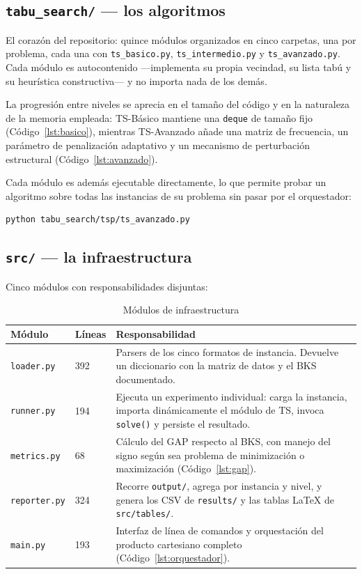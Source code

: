 \subsection{\texttt{tabu\_search/} --- los algoritmos}

El corazón del repositorio: quince módulos organizados en cinco carpetas, una
por problema, cada una con \texttt{ts\_basico.py}, \texttt{ts\_intermedio.py}
y \texttt{ts\_avanzado.py}. Cada módulo es autocontenido —implementa su propia
vecindad, su lista tabú y su heurística constructiva— y no importa nada de los
demás.

La progresión entre niveles se aprecia en el tamaño del código y en la
naturaleza de la memoria empleada: TS-Básico mantiene una \texttt{deque} de
tamaño fijo (Código~\ref{lst:basico}), mientras TS-Avanzado añade una matriz
de frecuencia, un parámetro de penalización adaptativo y un mecanismo de
perturbación estructural (Código~\ref{lst:avanzado}).

Cada módulo es además ejecutable directamente, lo que permite probar un
algoritmo sobre todas las instancias de su problema sin pasar por el
orquestador:

\begin{verbatim}
python tabu_search/tsp/ts_avanzado.py
\end{verbatim}

\subsection{\texttt{src/} --- la infraestructura}

Cinco módulos con responsabilidades disjuntas:

\begin{table}[H]
\centering
\caption{Módulos de infraestructura}
\label{tab:modulos_src}
\small
\begin{tabular}{llp{7cm}}
\toprule
\textbf{Módulo} & \textbf{Líneas} & \textbf{Responsabilidad} \\
\midrule
\texttt{loader.py}   & 392 & Parsers de los cinco formatos de instancia.
  Devuelve un diccionario con la matriz de datos y el BKS documentado. \\
\texttt{runner.py}   & 194 & Ejecuta un experimento individual: carga la
  instancia, importa dinámicamente el módulo de TS, invoca \texttt{solve()}
  y persiste el resultado. \\
\texttt{metrics.py}  &  68 & Cálculo del GAP respecto al BKS, con manejo del
  signo según sea problema de minimización o maximización
  (Código~\ref{lst:gap}). \\
\texttt{reporter.py} & 324 & Recorre \texttt{output/}, agrega por instancia
  y nivel, y genera los CSV de \texttt{results/} y las tablas LaTeX de
  \texttt{src/tables/}. \\
\texttt{main.py}     & 193 & Interfaz de línea de comandos y orquestación del
  producto cartesiano completo (Código~\ref{lst:orquestador}). \\
\bottomrule
\end{tabular}
\end{table}

